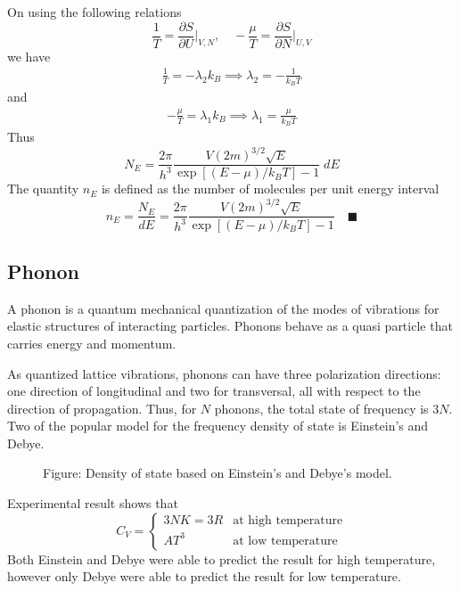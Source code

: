 \documentclass[../../../Main.tex]{subfiles}
\begin{document}
On using the following relations
\begin{equation*}
    \frac{1}{T}=\frac{\partial S}{\partial U}\bigg|_{V,N},\quad -\frac{\mu}{T}=\frac{\partial S}{\partial N}\bigg|_{U,V}
\end{equation*}
we have 
\begin{align*}
    \frac{1}{T}=-\lambda_2k_B\implies
    \lambda_2=-\frac{1}{k_BT}
\end{align*}
and
\begin{align*}
    -\frac{\mu}{T}=\lambda_1k_B\implies
    \lambda_1=\frac{\mu}{k_BT}
\end{align*}
Thus
\begin{equation*}
    N_E=\frac{2\pi}{h^3} \frac{V (2m)^{3/2}\sqrt{E}}{\exp\left[(E-\mu)/k_BT\right]-1} \;dE
\end{equation*}
The quantity $n_E$ is defined as the number of molecules per unit energy interval
\begin{equation*}
    n_E=\frac{N_E}{dE}=\frac{2\pi}{h^3} \frac{V (2m)^{3/2}\sqrt{E}}{\exp\left[(E-\mu)/k_BT\right]-1} \quad\blacksquare
\end{equation*}
 
\subsection*{Phonon}
A phonon is a quantum mechanical quantization of the modes of vibrations for elastic structures of interacting particles. Phonons behave as a quasi particle that carries energy and momentum. 

As quantized lattice vibrations, phonons can have three polarization directions: one direction of longitudinal and two for transversal, all with respect to the direction of propagation. Thus, for $N$ phonons, the total state of frequency is $3N$. Two of the popular model for the frequency density of state is Einstein's and Debye.
\begin{figure*}
    \centering
    \caption*{Figure: Density of state based on Einstein's and Debye's model.}
\end{figure*}

Experimental result shows that
\begin{equation*}
    C_V=\begin{cases}
        3NK=3R&\text{at high temperature}\\
        AT^3&\text{at low temperature}
    \end{cases}
\end{equation*}
Both Einstein and Debye were able to predict the result for high temperature, however only Debye were able to predict the result for low temperature.
\end{document}
